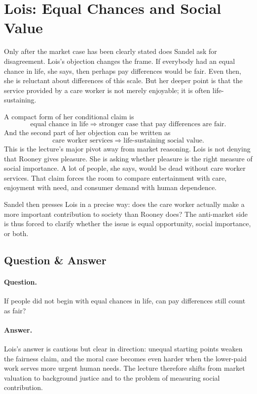 \section{Lois: Equal Chances and Social Value}

Only after the market case has been clearly stated does Sandel ask for disagreement. Lois's objection changes the frame. If everybody had an equal chance in life, she says, then perhaps pay differences would be fair. Even then, she is reluctant about differences of this scale. But her deeper point is that the service provided by a care worker is not merely enjoyable; it is often life-sustaining.

A compact form of her conditional claim is
\begin{equation}
\text{equal chance in life}
\Longrightarrow
\text{stronger case that pay differences are fair}.
\end{equation}
And the second part of her objection can be written as
\begin{equation}
\text{care worker services}
\Longrightarrow
\text{life-sustaining social value}.
\end{equation}
This is the lecture's major pivot away from market reasoning. Lois is not denying that Rooney gives pleasure. She is asking whether pleasure is the right measure of social importance. A lot of people, she says, would be dead without care worker services. That claim forces the room to compare entertainment with care, enjoyment with need, and consumer demand with human dependence.

Sandel then presses Lois in a precise way: does the care worker actually make a more important contribution to society than Rooney does? The anti-market side is thus forced to clarify whether the issue is equal opportunity, social importance, or both.

\subsection{Question \& Answer}

\paragraph{Question.} If people did not begin with equal chances in life, can pay differences still count as fair?

\paragraph{Answer.} Lois's answer is cautious but clear in direction: unequal starting points weaken the fairness claim, and the moral case becomes even harder when the lower-paid work serves more urgent human needs. The lecture therefore shifts from market valuation to background justice and to the problem of measuring social contribution.

